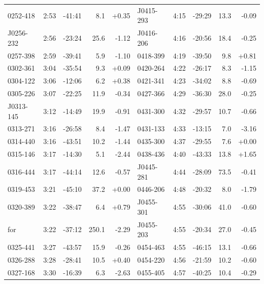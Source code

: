 \documentclass[preprint]{aastex}
\begin{document}
\begin{table}[ht]
\begin{tabular}{l|lrrr||l|lrrr}
  0252-418 &  2:53 & -41:41 &    8.1 & +0.35 &  J0415-293 &  4:15 & -29:29 &   13.3 & -0.09 \\
 J0256-232 &  2:56 & -23:24 &   25.6 & -1.12 &  J0416-206 &  4:16 & -20:56 &   18.4 & -0.25 \\
  0257-398 &  2:59 & -39:41 &    5.9 & -1.10 &   0418-399 &  4:19 & -39:50 &    9.8 & +0.81 \\
  0302-361 &  3:04 & -35:54 &    9.3 & +0.09 &   0420-264 &  4:22 & -26:17 &    8.3 & -1.15 \\
  0304-122 &  3:06 & -12:06 &    6.2 & +0.38 &   0421-341 &  4:23 & -34:02 &    8.8 & -0.69 \\
  0305-226 &  3:07 & -22:25 &   11.9 & -0.34 &   0427-366 &  4:29 & -36:30 &   28.0 & -0.25 \\
 J0313-145 &  3:12 & -14:49 &   19.9 & -0.91 &   0431-300 &  4:32 & -29:57 &   10.7 & -0.66 \\
  0313-271 &  3:16 & -26:58 &    8.4 & -1.47 &   0431-133 &  4:33 & -13:15 &    7.0 & -3.16 \\
  0314-440 &  3:16 & -43:51 &   10.2 & -1.44 &   0435-300 &  4:37 & -29:55 &    7.6 & +0.00 \\
  0315-146 &  3:17 & -14:30 &    5.1 & -2.44 &   0438-436 &  4:40 & -43:33 &   13.8 & +1.65 \\
  0316-444 &  3:17 & -44:14 &   12.6 & -0.57 &  J0445-281 &  4:44 & -28:09 &   73.5 & -0.41 \\
  0319-453 &  3:21 & -45:10 &   37.2 & +0.00 &   0446-206 &  4:48 & -20:32 &    8.0 & -1.79 \\
  0320-389 &  3:22 & -38:47 &    6.4 & +0.79 &  J0455-301 &  4:55 & -30:06 &   41.0 & -0.60 \\
       for &  3:22 & -37:12 &  250.1 & -2.29 &  J0455-203 &  4:55 & -20:34 &   27.0 & -0.45 \\
  0325-441 &  3:27 & -43:57 &   15.9 & -0.26 &   0454-463 &  4:55 & -46:15 &   13.1 & -0.66 \\
  0326-288 &  3:28 & -28:41 &   10.5 & +0.40 &   0454-220 &  4:56 & -21:59 &   10.2 & -0.60 \\
  0327-168 &  3:30 & -16:39 &    6.3 & -2.63 &   0455-405 &  4:57 & -40:25 &   10.4 & -0.29 \\
\hline
\end{tabular}
\end{table}
\end{document}
